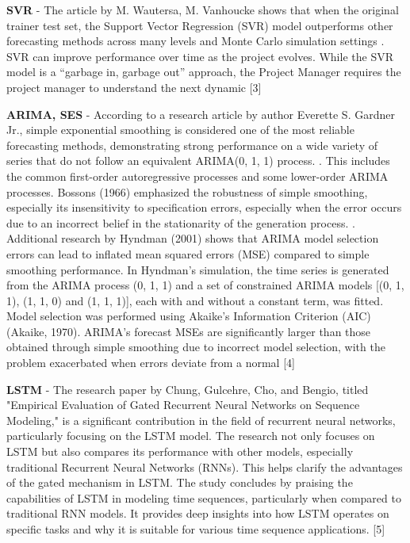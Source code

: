 \documentclass[conference]{IEEEtran}
\begin{document}
\textbf{SVR} - The article by M. Wautersa, M. Vanhoucke shows that when the original trainer test set, the Support Vector Regression (SVR) model outperforms other forecasting methods across many levels and Monte Carlo simulation settings . SVR can improve performance over time as the project evolves. While the SVR model is a “garbage in, garbage out” approach, the Project Manager requires the project manager to understand the next dynamic [3]

\textbf{ARIMA, SES} - According to a research article by author Everette S. Gardner Jr., simple exponential smoothing is considered one of the most reliable forecasting methods, demonstrating strong performance on a wide variety of series that do not follow an equivalent ARIMA(0, 1, 1) process. . This includes the common first-order autoregressive processes and some lower-order ARIMA processes. Bossons (1966) emphasized the robustness of simple smoothing, especially its insensitivity to specification errors, especially when the error occurs due to an incorrect belief in the stationarity of the generation process. . Additional research by Hyndman (2001) shows that ARIMA model selection errors can lead to inflated mean squared errors (MSE) compared to simple smoothing performance. In Hyndman's simulation, the time series is generated from the ARIMA process (0, 1, 1) and a set of constrained ARIMA models [(0, 1, 1), (1, 1, 0) and (1, 1, 1)], each with and without a constant term, was fitted. Model selection was performed using Akaike's Information Criterion (AIC) (Akaike, 1970). ARIMA's forecast MSEs are significantly larger than those obtained through simple smoothing due to incorrect model selection, with the problem exacerbated when errors deviate from a normal [4]

\textbf{LSTM} - The research paper by Chung, Gulcehre, Cho, and Bengio, titled "Empirical Evaluation of Gated Recurrent Neural Networks on Sequence Modeling," is a significant contribution in the field of recurrent neural networks, particularly focusing on the LSTM model. The research not only focuses on LSTM but also compares its performance with other models, especially traditional Recurrent Neural Networks (RNNs). This helps clarify the advantages of the gated mechanism in LSTM. The study concludes by praising the capabilities of LSTM in modeling time sequences, particularly when compared to traditional RNN models. It provides deep insights into how LSTM operates on specific tasks and why it is suitable for various time sequence applications. [5]
\end{document}
